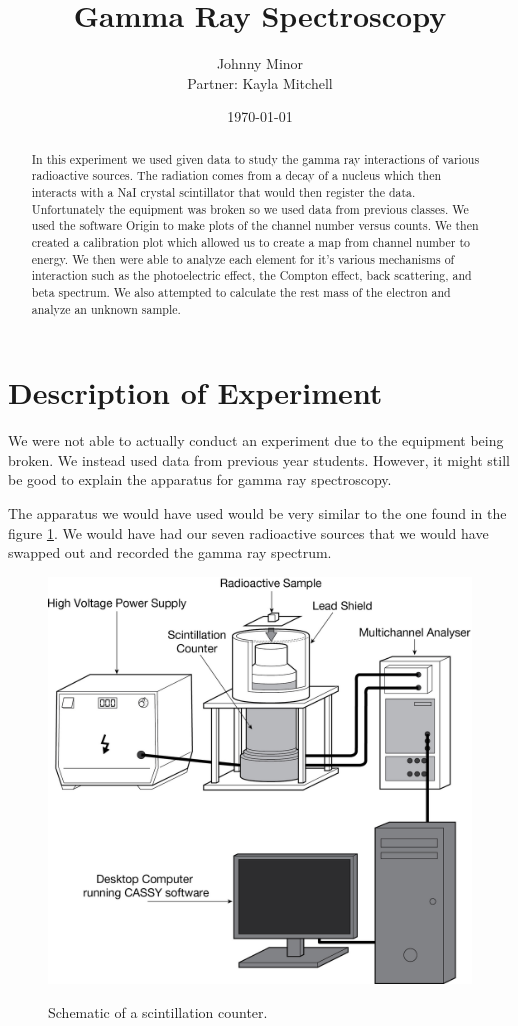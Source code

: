 \documentclass[12pt letterpaper]{article}
\title{Gamma Ray Spectroscopy}
\author{Johnny Minor \\ Partner: Kayla Mitchell}
\date{\today}
\begin{document}
\maketitle

\begin{abstract}
In this experiment we used given data to study the gamma ray interactions of various radioactive sources. The radiation comes from a decay of a nucleus which then interacts with a NaI crystal scintillator that would then register the data. Unfortunately the equipment was broken so we used data from previous classes. We used the software Origin to make plots of the channel number versus counts. We then created a calibration plot which allowed us to create a map from channel number to energy. We then were able to analyze each element for it's various mechanisms of interaction such as the photoelectric effect, the Compton effect, back scattering, and beta spectrum. We also attempted to calculate the rest mass of the electron and analyze an unknown sample. 
\end{abstract}

\newpage

\section*{Description of Experiment}

We were not able to actually conduct an experiment due to the equipment being broken. We instead used data from previous year students. However, it might still be good to explain the apparatus for gamma ray spectroscopy. 

The apparatus we would have used would be very similar to the one found in the figure \ref{fig:scintillator}. We would have had our seven radioactive sources that we would have swapped out and recorded the gamma ray spectrum. 

\begin{figure}[H]
  \caption{Schematic of a scintillation counter.}
  \centering
    \includegraphics[width=.5\textwidth]{scint_spec.jpg}
    \label{fig:scintillator}
\end{figure}
\end{document}
